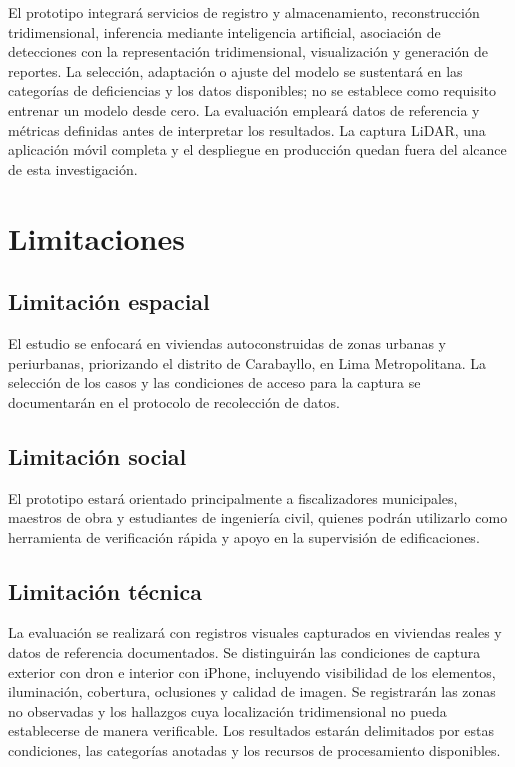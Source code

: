 \documentclass[12pt,oneside]{report}
\begin{document}
El prototipo integrará servicios de registro y almacenamiento, reconstrucción tridimensional, inferencia mediante inteligencia artificial, asociación de detecciones con la representación tridimensional, visualización y generación de reportes. La selección, adaptación o ajuste del modelo se sustentará en las categorías de deficiencias y los datos disponibles; no se establece como requisito entrenar un modelo desde cero. La evaluación empleará datos de referencia y métricas definidas antes de interpretar los resultados. La captura LiDAR, una aplicación móvil completa y el despliegue en producción quedan fuera del alcance de esta investigación.\par

\section{Limitaciones}

\subsection{Limitación espacial}
El estudio se enfocará en viviendas autoconstruidas de zonas urbanas y periurbanas, priorizando el distrito de Carabayllo, en Lima Metropolitana. La selección de los casos y las condiciones de acceso para la captura se documentarán en el protocolo de recolección de datos.

\subsection{Limitación social}
El prototipo estará orientado principalmente a fiscalizadores municipales, maestros de obra y estudiantes de ingeniería civil, quienes podrán utilizarlo como herramienta de verificación rápida y apoyo en la supervisión de edificaciones.

\subsection{Limitación técnica}
La evaluación se realizará con registros visuales capturados en viviendas reales y datos de referencia documentados. Se distinguirán las condiciones de captura exterior con dron e interior con iPhone, incluyendo visibilidad de los elementos, iluminación, cobertura, oclusiones y calidad de imagen. Se registrarán las zonas no observadas y los hallazgos cuya localización tridimensional no pueda establecerse de manera verificable. Los resultados estarán delimitados por estas condiciones, las categorías anotadas y los recursos de procesamiento disponibles.\par
\end{document}
